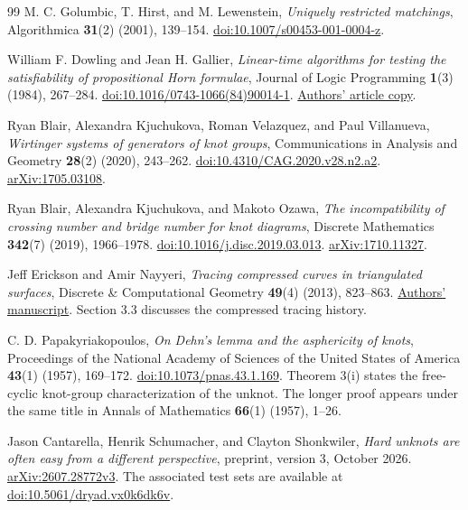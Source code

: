 \begin{thebibliography}{99}
M. C. Golumbic, T. Hirst, and M. Lewenstein,
\emph{Uniquely restricted matchings}, Algorithmica \textbf{31}(2)
(2001), 139--154.
\href{https://doi.org/10.1007/s00453-001-0004-z}{doi:10.1007/s00453-001-0004-z}.

William F. Dowling and Jean H. Gallier,
\emph{Linear-time algorithms for testing the satisfiability of
propositional Horn formulae}, Journal of Logic Programming
\textbf{1}(3) (1984), 267--284.
\href{https://doi.org/10.1016/0743-1066(84)90014-1}{doi:10.1016/0743-1066(84)90014-1}.
\href{https://www.seas.upenn.edu/~cis5110/Dowling-Gallier-Horn-sat.pdf}{Authors' article copy}.

Ryan Blair, Alexandra Kjuchukova, Roman Velazquez, and Paul Villanueva,
\emph{Wirtinger systems of generators of knot groups},
Communications in Analysis and Geometry \textbf{28}(2) (2020), 243--262.
\href{https://doi.org/10.4310/CAG.2020.v28.n2.a2}{doi:10.4310/CAG.2020.v28.n2.a2}.
\href{https://arxiv.org/abs/1705.03108}{arXiv:1705.03108}.

Ryan Blair, Alexandra Kjuchukova, and Makoto Ozawa,
\emph{The incompatibility of crossing number and bridge number for knot
diagrams}, Discrete Mathematics \textbf{342}(7) (2019), 1966--1978.
\href{https://doi.org/10.1016/j.disc.2019.03.013}{doi:10.1016/j.disc.2019.03.013}.
\href{https://arxiv.org/abs/1710.11327}{arXiv:1710.11327}.

Jeff Erickson and Amir Nayyeri,
\emph{Tracing compressed curves in triangulated surfaces},
Discrete \& Computational Geometry \textbf{49}(4) (2013), 823--863.
\href{https://jeffe.cs.illinois.edu/pubs/pdf/tracing.pdf}{Authors' manuscript}.
Section 3.3 discusses the compressed tracing history.

C. D. Papakyriakopoulos,
\emph{On Dehn's lemma and the asphericity of knots},
Proceedings of the National Academy of Sciences of the United States
of America \textbf{43}(1) (1957), 169--172.
\href{https://doi.org/10.1073/pnas.43.1.169}{doi:10.1073/pnas.43.1.169}.
Theorem 3(i) states the free-cyclic knot-group characterization of the
unknot. The longer proof appears under the same title in Annals of
Mathematics \textbf{66}(1) (1957), 1--26.

Jason Cantarella, Henrik Schumacher, and Clayton Shonkwiler,
\emph{Hard unknots are often easy from a different perspective},
preprint, version 3, October 2026.
\href{https://arxiv.org/abs/2607.28772v3}{arXiv:2607.28772v3}.
The associated test sets are available at
\href{https://doi.org/10.5061/dryad.vx0k6dk6v}{doi:10.5061/dryad.vx0k6dk6v}.

\end{thebibliography}
